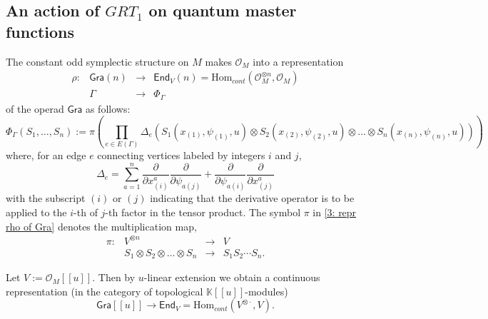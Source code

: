 \documentclass{amsart}
\theoremstyle{plain}
\theoremstyle{definition}
\begin{document}
\subsection{An action of ${GRT_1}$ on quantum master functions}\label{3: subsection on GRT action on qmfunctions}
The constant odd symplectic structure on $M$ makes ${{\mathcal O}}_M$ into a representation
\begin{equation}
\begin{array}{rccc}
\rho: & {{\mathsf G}} {{\mathsf r}}{{\mathsf a}}(n) & {\longrightarrow} & {{\mathsf E}} \mathsf n \mathsf d_V(n)={{\mathrm H\mathrm o\mathrm m}}_{cont}({{\mathcal O}}_M^{{\otimes} n},{{\mathcal O}}_M)\\
      & {\Gamma} &{\longrightarrow} & \Phi_{\Gamma}
\end{array}
\end{equation}
of the operad ${{\mathsf G}} {{\mathsf r}}{{\mathsf a}}$ as follows:
$$
\Phi_{\Gamma}(S_1,\ldots, S_n) :=\pi\left(\prod_{e\in E({\Gamma})} \Delta_e \left(S_1(x_{(1)}, \psi_{(1)},{u}){\otimes} S_2(x_{(2)}, \psi_{(2)},{u}){\otimes} \ldots{\otimes} S_n(x_{(n)}, \psi_{(n)},{u}) \right)\right)
$$
where, for an edge $e$ connecting vertices labeled by integers $i$ and $j$,
$$
\Delta_e= \sum_{a=1}^n \frac{{\partial}}{{{\partial}} x_{(i)}^a}  \frac{{\partial}}{{{\partial}} \psi_{a(j)}}
+
\frac{{\partial}}{{{\partial}} \psi_{a(i)}}  \frac{{\partial}}{{{\partial}} x_{(j)}^a}
$$
with the subscript $(i)$ or $(j)$ indicating that the derivative operator is to be applied to the $i$-th of $j$-th factor in the tensor product.
The symbol $\pi$ in \eqref{3: repr rho of Gra} denotes the multiplication map,
$$
\begin{array}{rccc}
\pi:&   V^{{\otimes} n} & {\longrightarrow} & V\\
   & S_1{\otimes} S_2{\otimes} \ldots {\otimes} S_n &{\longrightarrow} & S_1S_2\cdots S_n.
\end{array}
$$

Let $V:={{\mathcal O}}_M[[{u}]]$. Then by ${u}$-linear extension we obtain a continuous representation (in the category of topological ${{\mathbb K}}[[{u}]]$-modules)
\begin{equation} \label{3: repr rho of Gra}
 {{\mathsf G}} {{\mathsf r}}{{\mathsf a}}[[u]]  {\longrightarrow}  {{\mathsf E}} \mathsf n \mathsf d_V={{\mathrm H\mathrm o\mathrm m}}_{cont}(V^{{\otimes} \cdot},V).
\end{equation}
\end{document}
